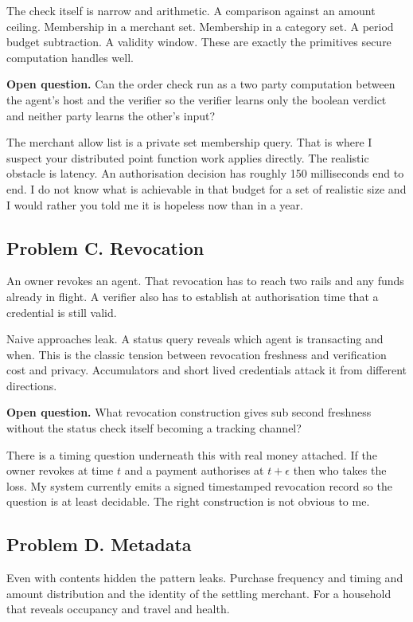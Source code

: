 \documentclass[journal,onecolumn,11pt]{IEEEtran}
\newcommand{\q}[1]{\textcolor{warnc}{\textbf{Open question.}} #1}
\begin{document}
The check itself is narrow and arithmetic. A comparison against an amount ceiling.
Membership in a merchant set. Membership in a category set. A period budget subtraction.
A validity window. These are exactly the primitives secure computation handles well.

\q{Can the order check run as a two party computation between the agent's host and the
verifier so the verifier learns only the boolean verdict and neither party learns the
other's input?}

The merchant allow list is a private set membership query. That is where I suspect your
distributed point function work applies directly. The realistic obstacle is latency. An
authorisation decision has roughly 150 milliseconds end to end. I do not know what is
achievable in that budget for a set of realistic size and I would rather you told me it
is hopeless now than in a year.

\subsection{Problem C. Revocation}
An owner revokes an agent. That revocation has to reach two rails and any funds already
in flight. A verifier also has to establish at authorisation time that a credential is
still valid.

Naive approaches leak. A status query reveals which agent is transacting and when. This
is the classic tension between revocation freshness and verification cost and privacy.
Accumulators and short lived credentials attack it from different directions.

\q{What revocation construction gives sub second freshness without the status check
itself becoming a tracking channel?}

There is a timing question underneath this with real money attached. If the owner revokes
at time $t$ and a payment authorises at $t + \epsilon$ then who takes the loss. My system
currently emits a signed timestamped revocation record so the question is at least
decidable. The right construction is not obvious to me.

\subsection{Problem D. Metadata}
Even with contents hidden the pattern leaks. Purchase frequency and timing and amount
distribution and the identity of the settling merchant. For a household that reveals
occupancy and travel and health.
\end{document}

